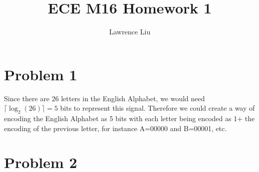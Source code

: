 \documentclass[12pt]{article}
\title{ECE M16 Homework 1}
\author{Lawrence Liu}
\begin{document}
\maketitle
\section*{Problem 1}
Since there are 26 letters in the English Alphabet, we would need $\lceil \log_2 (26)\rceil=5$ bits to represent this signal.
Therefore we could create a way of encoding the English Alphabet as 5 bits with each letter being encoded as 1+ the encoding of the previous letter, for instance 
A=00000 and B=00001, etc.
\section*{Problem 2}
\end{document}
